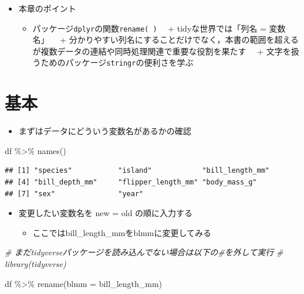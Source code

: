 \documentclass[
  xelatex,ja=standard, b5paper]{bxjsbook}
\newenvironment{Shaded}{\begin{snugshade}}{\end{snugshade}}
\newcommand{\AttributeTok}[1]{\textcolor[rgb]{0.77,0.63,0.00}{#1}}
\newcommand{\CommentTok}[1]{\textcolor[rgb]{0.56,0.35,0.01}{\textit{#1}}}
\newcommand{\FunctionTok}[1]{\textcolor[rgb]{0.00,0.00,0.00}{#1}}
\newcommand{\NormalTok}[1]{#1}
\newcommand{\SpecialCharTok}[1]{\textcolor[rgb]{0.00,0.00,0.00}{#1}}
\providecommand{\tightlist}{%
  \setlength{\itemsep}{0pt}\setlength{\parskip}{0pt}}
\begin{document}
\begin{itemize}
\tightlist
\item
  本章のポイント

  \begin{itemize}
  \tightlist
  \item
    パッケージ\texttt{dplyr}の関数\texttt{rename(\ )}
    　+ tidyな世界では「列名 = 変数名」
    　+ 分かりやすい列名にすることだけでなく，本書の範囲を超えるが複数データの連結や同時処理関連で重要な役割を果たす
    　+ 文字を扱うためのパッケージ\texttt{stringr}の便利さを学ぶ
  \end{itemize}
\end{itemize}

\hypertarget{rename-standard}{%
\section{基本}\label{rename-standard}}

\begin{itemize}
\tightlist
\item
  まずはデータにどういう変数名があるかの確認
\end{itemize}

\begin{Shaded}
\begin{Highlighting}[]
\NormalTok{df }\SpecialCharTok{\%\textgreater{}\%} \FunctionTok{names}\NormalTok{()}
\end{Highlighting}
\end{Shaded}

\begin{verbatim}
## [1] "species"           "island"            "bill_length_mm"   
## [4] "bill_depth_mm"     "flipper_length_mm" "body_mass_g"      
## [7] "sex"               "year"
\end{verbatim}

\begin{itemize}
\tightlist
\item
  変更したい変数名を new = old の順に入力する

  \begin{itemize}
  \tightlist
  \item
    ここではbill\_length\_mmをblmmに変更してみる
  \end{itemize}
\end{itemize}

\begin{Shaded}
\begin{Highlighting}[]
\CommentTok{\# まだtidyverseパッケージを読み込んでない場合は以下の\#を外して実行}
\CommentTok{\# library(tidyverse)}

\NormalTok{df }\SpecialCharTok{\%\textgreater{}\%} 
  \FunctionTok{rename}\NormalTok{(}\AttributeTok{blmm =}\NormalTok{ bill\_length\_mm)}
\end{Highlighting}
\end{Shaded}
\end{document}
